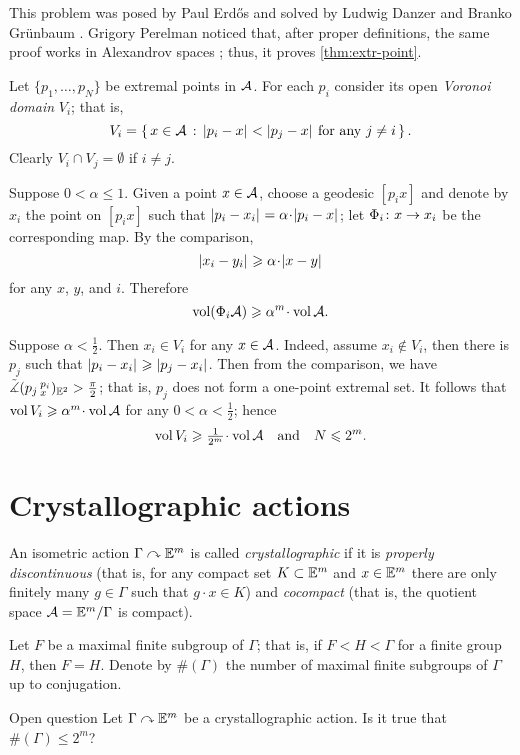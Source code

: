 This problem was posed by Paul Erdős \cite{erdos} and solved by Ludwig Danzer and Branko Gr\"unbaum \cite{danzer-gruenbaum}.
Grigory Perelman noticed that, after proper definitions, the same proof works in Alexandrov spaces \cite{perelman-Erdos}; thus, it proves \ref{thm:extr-point}.

Let $\{p_1,\dots,p_N\}$ be extremal points in $\mathcal{A}$.
For each $p_i$ consider its open \emph{Voronoi domain} $V_i$; that is, 
\[V_i=\set{x\in \spc{A}}{\dist{p_i}{x}{}<\dist{p_j}{x}{}\ \text{for any}\ j\not=i}.\]
Clearly $V_i\cap V_j=\emptyset$ if $i\not=j$.

Suppose  $0<\alpha\le 1$.
Given a point $x\in\mathcal{A}$, choose a geodesic $[p_ix]$ and denote by $x_i$ the point on $[p_ix]$ such that $\dist{p_i}{x_i}{}=\alpha\cdot\dist{p_i}{x}{}$;
let $\Phi_i\colon x\to x_i$ be the corresponding map.
By the comparison, 
\[\dist{x_i}{y_i}{}\ge\alpha\cdot \dist{x}{y}{}\]
for any $x$, $y$, and $i$.
Therefore 
\[\vol(\map_i \spc{A})\ge\alpha^m\cdot\vol \spc{A}.\]

Suppose $\alpha<\tfrac12$.
Then $x_i\in V_i$ for any $x\in \mathcal{A}$.
Indeed, assume $x_i\notin V_i$,
then there is $p_j$ such that $|{p_i}-{x_i}|_{}^{{}}\geqslant|{p_j}-{x_i}|_{}^{{}}$.
Then from the comparison, we have $\tilde\measuredangle(p_j\,{}^{p_i}_{x})_{\mathbb{E}^2}>\tfrac\pi2$;
that is, $p_j$ does not form a one-point extremal set.
It follows that $\vol V_i\ge\alpha^m\cdot\vol \spc{A}$
for any $0<\alpha<\tfrac12$; hence 
\[\vol V_i\ge\tfrac1{2^m}\cdot\vol \spc{A}\quad\text{and}\quad N\le 2^m.\]
\qedsf

\section{Crystallographic actions}


An isometric action $\Gamma\curvearrowright \mathbb{E}^m$ is called \emph{crystallographic} if it is 
\emph{properly discontinuous} (that is, for any compact set $K\subset \mathbb{E}^m$ and $x\in \mathbb{E}^m$ there are only finitely many $g\in \Gamma$ such that $g\cdot x\in K$) and \emph{cocompact} (that is, the quotient space $\mathcal{A}=\mathbb{E}^m/\Gamma$ is compact).

Let $F$ be a maximal finite subgroup of $\Gamma$;
that is, if $F<H<\Gamma$ for a finite group $H$, then $F=H$.
Denote by $\#(\Gamma)$ the number of maximal finite subgroups of $\Gamma$ up to conjugation.

\begin{thm}{Open question}
Let $\Gamma\curvearrowright \mathbb{E}^m$ be a crystallographic action.
Is it true that $\#(\Gamma)\le 2^m$?
\end{thm}

